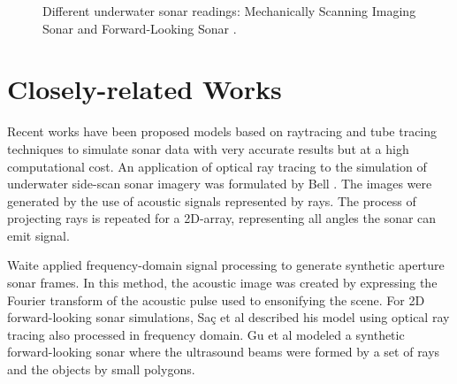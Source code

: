 \documentclass[final,5p,times]{elsarticle}
\begin{document}
\begin{figure}[h]
    \centering
    \captionsetup{justification=centering}
    \caption{Different underwater sonar readings: Mechanically Scanning Imaging Sonar  and Forward-Looking Sonar .}
    \label{fig:sonar_devices}
\end{figure}


\section{Closely-related Works}
\label{relatedworks}

Recent works have been proposed models based on raytracing and tube tracing techniques to simulate sonar data with very accurate results but at a high computational cost. An application of optical ray tracing to the simulation of underwater side-scan sonar imagery was formulated by Bell \cite{bell1997}. The images were generated by the use of acoustic signals represented by rays. The process of projecting rays is repeated for a 2D-array, representing all angles the sonar can emit signal.

Waite \cite{waite2002} applied frequency-domain signal processing to generate synthetic aperture sonar frames. In this method, the acoustic image was created by expressing the Fourier transform of the acoustic pulse used to ensonifying the scene. For 2D forward-looking sonar simulations, Saç et al \cite{sac2015} described his model using optical ray tracing also processed in frequency domain. Gu et al \cite{gu2013} modeled a synthetic forward-looking sonar where the ultrasound beams were formed by a set of rays and the objects by small polygons.
\end{document}
